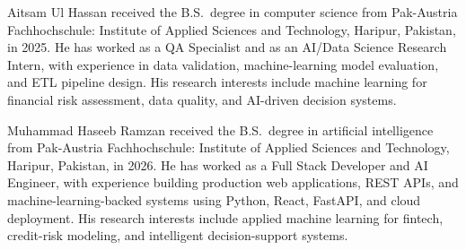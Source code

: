 \documentclass{ieeeaccess}
\begin{document}
\clearpage
\begin{IEEEbiographynophoto}{Aitsam Ul Hassan}
received the B.S.\ degree in computer science from Pak-Austria Fachhochschule: Institute of Applied Sciences and Technology, Haripur, Pakistan, in 2025.
He has worked as a QA Specialist and as an AI/Data Science Research Intern, with experience in data validation, machine-learning model evaluation, and ETL pipeline design.
His research interests include machine learning for financial risk assessment, data quality, and AI-driven decision systems.
\end{IEEEbiographynophoto}

\begin{IEEEbiographynophoto}{Muhammad Haseeb Ramzan}
received the B.S.\ degree in artificial intelligence from Pak-Austria Fachhochschule: Institute of Applied Sciences and Technology, Haripur, Pakistan, in 2026.
He has worked as a Full Stack Developer and AI Engineer, with experience building production web applications, REST APIs, and machine-learning-backed systems using Python, React, FastAPI, and cloud deployment.
His research interests include applied machine learning for fintech, credit-risk modeling, and intelligent decision-support systems.
\end{IEEEbiographynophoto}

\EOD
\end{document}
